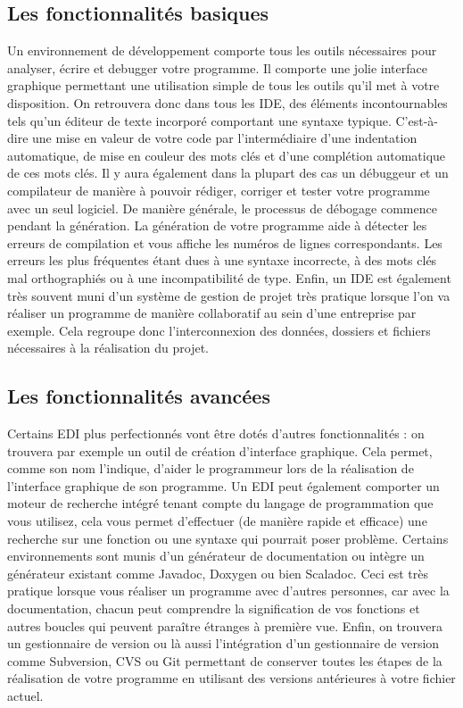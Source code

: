 \documentclass[a4paper, 12pt]{article}
\begin{document}
\begin{doublespace}
\subsection{Les fonctionnalités basiques}
Un environnement de développement comporte tous les outils nécessaires pour analyser, écrire et debugger votre programme. Il comporte une jolie interface graphique permettant une utilisation simple de tous les outils qu’il met à votre disposition.  On retrouvera donc dans tous les IDE, des éléments incontournables tels qu’un éditeur de texte incorporé comportant une syntaxe typique. C’est-à-dire une  mise en valeur de votre code par l'intermédiaire d'une indentation automatique, de mise en couleur des mots clés et d'une complétion automatique de ces mots clés. Il y aura également dans la plupart des cas un débuggeur et un compilateur de manière à pouvoir rédiger, corriger et tester votre programme avec un seul logiciel. De manière générale, le processus de débogage commence pendant la génération. La génération de votre programme  aide à détecter les erreurs de compilation et vous affiche les numéros de lignes correspondants. Les erreurs les plus fréquentes étant dues à une syntaxe incorrecte, à des mots clés mal orthographiés ou à une incompatibilité de type. Enfin, un IDE est également très souvent muni d’un système de gestion de projet très pratique lorsque l’on va réaliser un programme de manière collaboratif au sein d’une entreprise par exemple. Cela regroupe donc  l’interconnexion des données, dossiers et fichiers nécessaires à la réalisation du projet.

\newpage \subsection{Les fonctionnalités avancées}
Certains EDI plus perfectionnés vont être dotés d’autres fonctionnalités : on trouvera par exemple un outil de création d’interface graphique. Cela permet, comme son nom l’indique, d’aider le programmeur lors de la réalisation de l’interface graphique de son programme.  Un EDI peut également comporter un moteur de recherche intégré tenant compte du langage de programmation que vous utilisez, cela vous permet d’effectuer (de manière rapide et efficace) une recherche sur une fonction ou une syntaxe qui pourrait poser problème. Certains environnements sont munis d’un générateur de documentation ou intègre un générateur existant comme Javadoc, Doxygen ou bien Scaladoc. Ceci est très pratique lorsque vous réaliser un programme avec d’autres personnes, car avec la documentation, chacun peut comprendre la signification de vos fonctions et autres boucles qui peuvent paraître étranges à première vue. Enfin, on trouvera un gestionnaire de version ou là aussi l’intégration d’un gestionnaire de version comme Subversion, CVS ou Git permettant de conserver toutes les étapes de la réalisation de votre programme en utilisant des versions antérieures à votre fichier actuel.

\end{doublespace}
\end{document}
